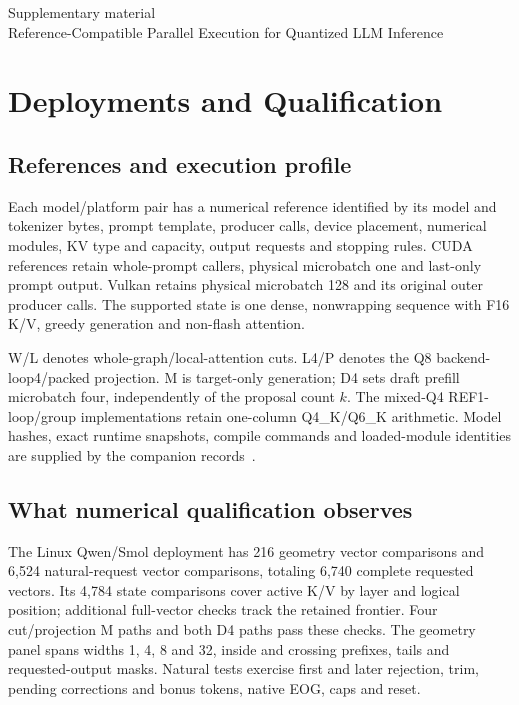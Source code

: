 \setcounter{section}{0}
\setcounter{dbltopnumber}{3}
\renewcommand{\thesection}{S\arabic{section}}
\setcounter{table}{0}
\setcounter{figure}{0}
\begin{center}
{\Large Supplementary material}\\[4pt]
{\normalsize Reference-Compatible Parallel Execution for Quantized LLM Inference}
\end{center}

\section{Deployments and Qualification}
\subsection{References and execution profile}
Each model/platform pair has a numerical reference identified by its model and tokenizer bytes, prompt template, producer calls, device placement, numerical modules, KV type and capacity, output requests and stopping rules. CUDA references retain whole-prompt callers, physical microbatch one and last-only prompt output. Vulkan retains physical microbatch 128 and its original outer producer calls. The supported state is one dense, nonwrapping sequence with F16 K/V, greedy generation and non-flash attention.

W/L denotes whole-graph/local-attention cuts. L4/P denotes the Q8 backend-loop4/packed projection. M is target-only generation; D4 sets draft prefill microbatch four, independently of the proposal count $k$. The mixed-Q4 REF1-loop/group implementations retain one-column Q4\_K/Q6\_K arithmetic. Model hashes, exact runtime snapshots, compile commands and loaded-module identities are supplied by the companion records~\cite{records}.

\subsection{What numerical qualification observes}
The Linux Qwen/Smol deployment has 216 geometry vector comparisons and 6,524 natural-request vector comparisons, totaling 6,740 complete requested vectors. Its 4,784 state comparisons cover active K/V by layer and logical position; additional full-vector checks track the retained frontier. Four cut/projection M paths and both D4 paths pass these checks. The geometry panel spans widths 1, 4, 8 and 32, inside and crossing prefixes, tails and requested-output masks. Natural tests exercise first and later rejection, trim, pending corrections and bonus tokens, native EOG, caps and reset.

